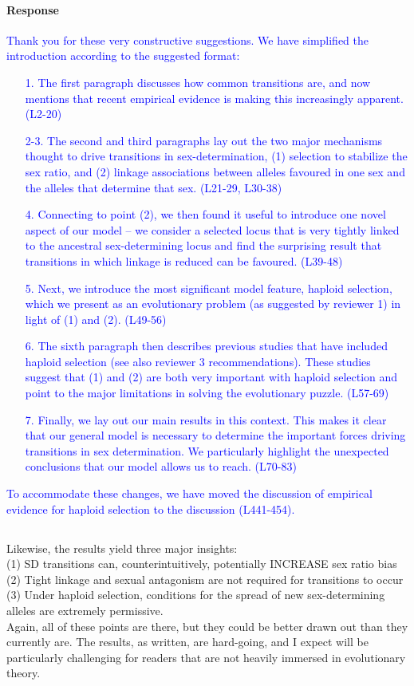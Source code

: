 \documentclass[10pt,letterpaper]{article}
\begin{document}
\noindent\paragraph{Response}
\textcolor{blue}{
Thank you for these very constructive suggestions. We have simplified the introduction according to the suggested format: 
\begin{enumerate}
\item[1.]{The first paragraph discusses how common transitions are, and now mentions that recent empirical evidence is making this increasingly apparent. (L2-20)}
\item[2-3.]{The second and third paragraphs lay out the two major mechanisms thought to drive transitions in sex-determination, (1) selection to stabilize the sex ratio, and (2) linkage associations between alleles favoured in one sex and the alleles that determine that sex. (L21-29, L30-38) }
\item[4.]{Connecting to point (2), we then found it useful to introduce one novel aspect of our model -- we consider a selected locus that is very tightly linked to the ancestral sex-determining locus and find the surprising result that transitions in which linkage is reduced can be favoured. (L39-48)}
\item[5.]{Next, we introduce the most significant model feature, haploid selection, which we present as an evolutionary problem (as suggested by reviewer 1) in light of (1) and (2). (L49-56) }
\item[6.]{The sixth paragraph then describes previous studies that have included haploid selection (see also reviewer 3 recommendations). These studies suggest that (1) and (2) are both very important with haploid selection and point to the major limitations in solving the evolutionary puzzle. (L57-69)}
\item[7.]{Finally, we lay out our main results in this context. This makes it clear that our general model is necessary to determine the important forces driving transitions in sex determination. We particularly highlight the unexpected conclusions that our model allows us to reach. (L70-83)}
\end{enumerate}
To accommodate these changes, we have moved the discussion of empirical evidence for haploid selection to the discussion (L441-454). 
}

\noindent\subsection{}
Likewise, the results yield three major insights:\\
(1) SD transitions can, counterintuitively, potentially INCREASE sex ratio bias\\
(2) Tight linkage and sexual antagonism are not required for transitions to occur\\
(3) Under haploid selection, conditions for the spread of new sex-determining alleles are extremely permissive.\\
Again, all of these points are there, but they could be better drawn out than they currently are. The results, as written, are hard-going, and I expect will be particularly challenging for readers that are not heavily immersed in evolutionary theory.
\end{document}
